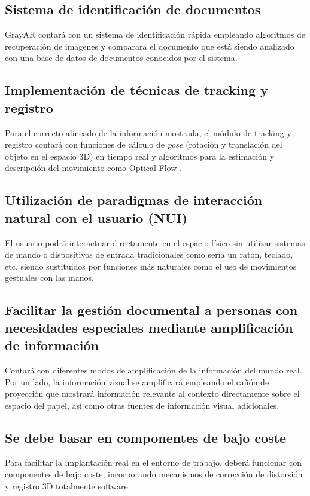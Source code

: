 \subsection{Sistema de identificación de documentos}
GrayAR contará con un sistema de identificación rápida empleando algoritmos de recuperación de imágenes y comparará el documento que está siendo analizado con una base de datos de documentos conocidos por el sistema.

\subsection{Implementación de técnicas de tracking y registro}
Para el correcto alineado de la información mostrada, el módulo de tracking y registro contará con funciones de cálculo de \emph{pose} (rotación y translación del objeto en el espacio 3D) en tiempo real y algoritmos para la estimación y descripción del movimiento como Optical Flow \cite{LKanade}.   

\subsection{Utilización de paradigmas de interacción natural con el usuario  (NUI)}
El usuario podrá interactuar directamente en el espacio físico sin utilizar sistemas de mando o dispositivos de entrada tradicionales como sería un ratón, teclado, etc. siendo sustituidos por funciones más naturales como el uso de movimientos gestuales con las manos.

\subsection{Facilitar la gestión documental a personas con necesidades especiales mediante amplificación de información} 
Contará con diferentes modos de amplificación de la información del mundo real. Por un lado, la información visual se amplificará empleando el cañón de proyección que mostrará información relevante al contexto directamente sobre el espacio del papel, así como otras fuentes de información visual adicionales. 

\subsection{Se debe basar en componentes de bajo coste}
Para facilitar la implantación real en el entorno de trabajo, deberá funcionar con componentes de bajo coste, incorporando mecanismos de corrección de distorsión y registro 3D totalmente software.

